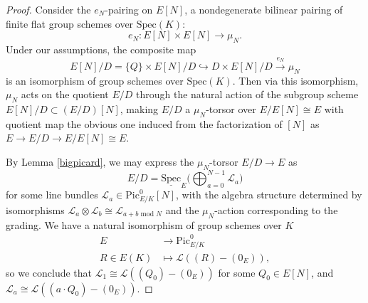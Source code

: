 \documentclass[11pt]{amsart}
\theoremstyle{definition}
\begin{document}
\begin{proof}
Consider the $e_N$-pairing on $E[N]$, a nondegenerate bilinear pairing of finite flat group schemes over $\mathrm{Spec}(K)$: 
\begin{displaymath}
e_N: E[N] \times E[N] \rightarrow \mu_N.
\end{displaymath}
Under our assumptions, the composite map 
\begin{displaymath}
E[N]/D = \{Q\}\times E[N]/D \hookrightarrow D \times E[N]/D \stackrel{e_N}{\rightarrow} \mu_N
\end{displaymath}
is an isomorphism of group schemes over $\mathrm{Spec}(K)$. Then via this isomorphism, $\mu_N$ acts on the quotient $E/D$ through the natural action of the subgroup scheme $E[N]/D \subset (E/D)[N]$, making $E/D$ a $\mu_N$-torsor over $E/E[N] \cong E$ with quotient map the obvious one induced from the factorization of $[N]$ as $E \rightarrow E/D \rightarrow E/E[N] \cong E$.

By Lemma \ref{bigpicard}, we may express the $\mu_N$-torsor $E/D \rightarrow E$ as 
\begin{displaymath}
E/D = \underline{\mathrm{Spec}}_E \big( \bigoplus_{a = 0}^{N-1} {\mathcal{L}}_a \big)
\end{displaymath}
for some line bundles ${\mathcal{L}}_a \in \mathrm{Pic}^0_{E/K}[N]$, with the algebra structure determined by isomorphisms ${\mathcal{L}}_a \otimes {\mathcal{L}}_b \cong {\mathcal{L}}_{\textrm{$a+b$ mod $N$}}$ and the $\mu_N$-action corresponding to the grading. We have a natural isomorphism of group schemes over $K$ 
\begin{align*}
E & \rightarrow \mathrm{Pic}^0_{E/K} \\
R \in E(K) & \mapsto {\mathcal{L}}((R)-(0_E)),
\end{align*}
so we conclude that ${\mathcal{L}}_1 \cong {\mathcal{L}}((Q_0)-(0_E))$ for some $Q_0 \in E[N]$, and ${\mathcal{L}}_a \cong {\mathcal{L}}((a\cdot Q_0)-(0_E))$.


\end{proof}
\end{document}
